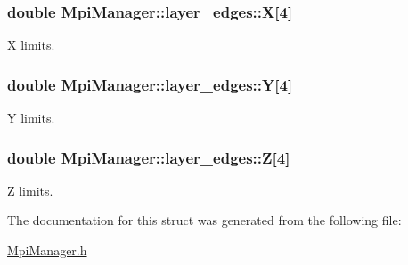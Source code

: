 \subsubsection[{\texorpdfstring{X}{X}}]{\setlength{\rightskip}{0pt plus 5cm}double Mpi\+Manager\+::layer\+\_\+edges\+::X\mbox{[}4\mbox{]}}\hypertarget{struct_mpi_manager_1_1layer__edges_a9f79fa4b504f2d4418f2bc4747cc908c}{}\label{struct_mpi_manager_1_1layer__edges_a9f79fa4b504f2d4418f2bc4747cc908c}


X limits. 

\subsubsection[{\texorpdfstring{Y}{Y}}]{\setlength{\rightskip}{0pt plus 5cm}double Mpi\+Manager\+::layer\+\_\+edges\+::Y\mbox{[}4\mbox{]}}\hypertarget{struct_mpi_manager_1_1layer__edges_aa4d880e027a6410ff4b34e28dcd1f9d4}{}\label{struct_mpi_manager_1_1layer__edges_aa4d880e027a6410ff4b34e28dcd1f9d4}


Y limits. 

\subsubsection[{\texorpdfstring{Z}{Z}}]{\setlength{\rightskip}{0pt plus 5cm}double Mpi\+Manager\+::layer\+\_\+edges\+::Z\mbox{[}4\mbox{]}}\hypertarget{struct_mpi_manager_1_1layer__edges_a25eea1176a0c06c1e25a7a08b8840283}{}\label{struct_mpi_manager_1_1layer__edges_a25eea1176a0c06c1e25a7a08b8840283}


Z limits. 



The documentation for this struct was generated from the following file\+:\begin{DoxyCompactItemize}
\item 
\hyperlink{_mpi_manager_8h}{Mpi\+Manager.\+h}\end{DoxyCompactItemize}

